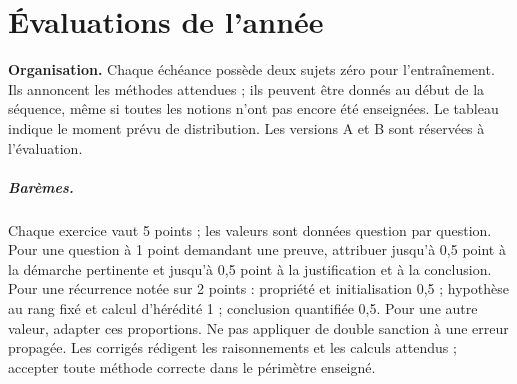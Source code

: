 \chapter{Évaluations de l'année}
\textbf{Organisation.} Chaque échéance possède deux sujets zéro pour l'entraînement. Ils annoncent les méthodes attendues ; ils peuvent être donnés au début de la séquence, même si toutes les notions n'ont pas encore été enseignées. Le tableau indique le moment prévu de distribution. Les versions A et B sont réservées à l'évaluation.
\ifprof
\paragraph{Barèmes.} Chaque exercice vaut 5 points ; les valeurs sont données question par question. Pour une question à 1 point demandant une preuve, attribuer jusqu'à 0,5 point à la démarche pertinente et jusqu'à 0,5 point à la justification et à la conclusion. Pour une récurrence notée sur 2 points : propriété et initialisation 0,5 ; hypothèse au rang fixé et calcul d'hérédité 1 ; conclusion quantifiée 0,5. Pour une autre valeur, adapter ces proportions. Ne pas appliquer de double sanction à une erreur propagée. Les corrigés rédigent les raisonnements et les calculs attendus ; accepter toute méthode correcte dans le périmètre enseigné.
